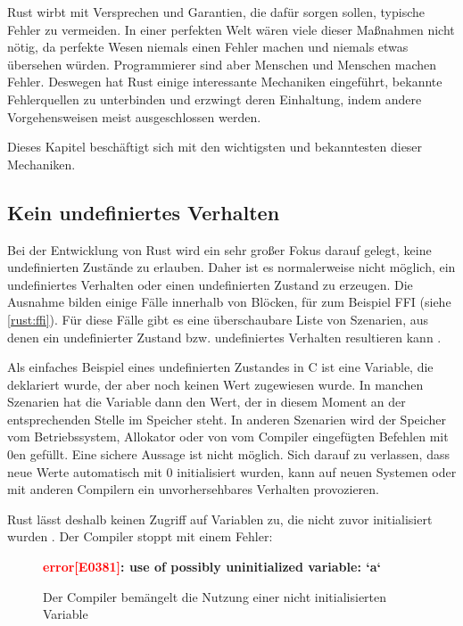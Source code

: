 Rust wirbt mit Versprechen und Garantien, die dafür sorgen sollen, typische Fehler zu vermeiden.
In einer perfekten Welt wären viele dieser Maßnahmen nicht nötig, da perfekte Wesen niemals einen Fehler machen und niemals etwas übersehen würden.
Programmierer sind aber Menschen und Menschen machen Fehler.
Deswegen hat Rust einige interessante Mechaniken eingeführt, bekannte Fehlerquellen zu unterbinden und erzwingt deren Einhaltung, indem andere Vorgehensweisen meist ausgeschlossen werden.

Dieses Kapitel beschäftigt sich mit den wichtigsten und bekanntesten dieser Mechaniken.

\subsection{Kein undefiniertes Verhalten}
\label{rust:no_unitialized_usage}
\label{rust:no_undefined}

Bei der Entwicklung von Rust wird ein sehr großer Fokus darauf gelegt, keine undefinierten Zustände zu erlauben.
Daher ist es normalerweise nicht möglich, ein undefiniertes Verhalten oder einen undefinierten Zustand zu erzeugen.
Die Ausnahme bilden einige Fälle innerhalb von  Blöcken, für zum Beispiel FFI (siehe \autoref{rust:ffi}).
Für diese Fälle gibt es eine überschaubare Liste von Szenarien, aus denen ein undefinierter Zustand bzw. undefiniertes Verhalten resultieren kann \cite{rust:book:undefined}.

Als einfaches Beispiel eines undefinierten Zustandes in C ist eine Variable, die deklariert wurde, der aber noch keinen Wert zugewiesen wurde.
In manchen Szenarien hat die Variable dann den Wert, der in diesem Moment an der entsprechenden Stelle im Speicher steht.
In anderen Szenarien wird der Speicher vom Betriebssystem, Allokator oder von vom Compiler eingefügten Befehlen mit 0en gefüllt.
Eine sichere Aussage ist nicht möglich.
Sich darauf zu verlassen, dass neue Werte automatisch mit 0 initialisiert wurden, kann auf neuen Systemen oder mit anderen Compilern ein unvorhersehbares Verhalten provozieren.

Rust lässt deshalb keinen Zugriff auf Variablen zu, die nicht zuvor initialisiert wurden \cite[126]{rust:orly_programming}.
Der Compiler stoppt mit einem Fehler:

\begin{figure}[H]
	\begin{tcolorbox}[colback=codeBackground,boxrule=0pt,arc=0pt]
		\begin{scriptsize}
			\textbf{\textcolor{red}{error[E0381]}: use of possibly uninitialized variable: `a`}
		\end{scriptsize}
	\end{tcolorbox}
	\caption{Der Compiler bemängelt die Nutzung einer nicht initialisierten Variable}
	\label{rust:rustc:error:no_unitialized_usage}
\end{figure}


